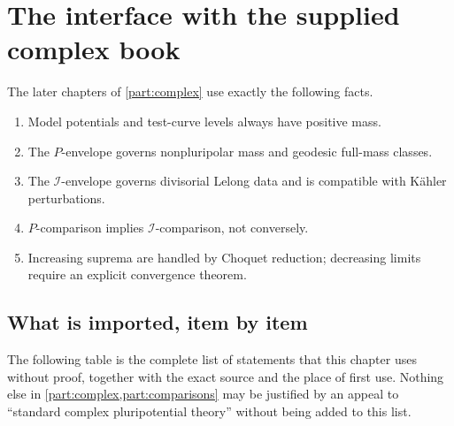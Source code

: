 \section{The interface with the supplied complex book}
\label{sec:ch51-interface}

\begin{remark}
\label{chk:complex-interface}
The later chapters of \cref{part:complex} use exactly the following facts.
\begin{enumerate}
\item Model potentials and test-curve levels always have positive mass.
\item The \(P\)-envelope governs nonpluripolar mass and geodesic full-mass
      classes.
\item The \(\mathcal I\)-envelope governs divisorial Lelong data and is
      compatible with K\"ahler perturbations.
\item \(P\)-comparison implies \(\mathcal I\)-comparison, not conversely.
\item Increasing suprema are handled by Choquet reduction; decreasing
      limits require an explicit convergence theorem.
\end{enumerate}
\end{remark}

\subsection{What is imported, item by item}
\label{sec:ch51-import-ledger}

The following table is the complete list of statements that this chapter
uses without proof, together with the exact source and the place of first
use.  Nothing else in \cref{part:complex,part:comparisons} may be
justified by an appeal to ``standard complex pluripotential theory''
without being added to this list.

